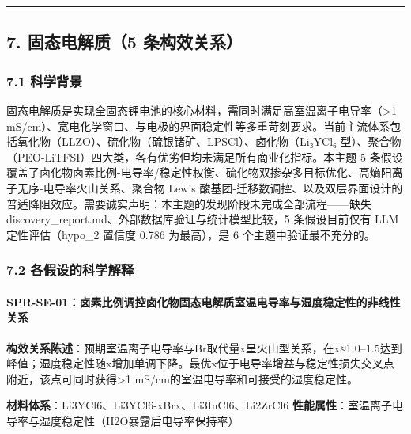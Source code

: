 \documentclass[12pt,a4paper]{ctexart}
\begin{document}
\begin{center}\rule{0.5\linewidth}{0.5pt}\end{center}

\subsection{7. 固态电解质（5 条构效关系）}\label{ux56faux6001ux7535ux89e3ux8d285-ux6761ux6784ux6548ux5173ux7cfb}

\subsubsection{7.1 科学背景}\label{ux79d1ux5b66ux80ccux666f-5}

固态电解质是实现全固态锂电池的核心材料，需同时满足高室温离子电导率（\textgreater1 mS/cm）、宽电化学窗口、与电极的界面稳定性等多重苛刻要求。当前主流体系包括氧化物（LLZO）、硫化物（硫银锗矿、LPSCl）、卤化物（Li₃YCl₆ 型）、聚合物（PEO-LiTFSI）四大类，各有优劣但均未满足所有商业化指标。本主题 5 条假设覆盖了卤化物卤素比例-电导率/稳定性权衡、硫化物双掺杂多目标优化、高熵阳离子无序-电导率火山关系、聚合物 Lewis 酸基团-迁移数调控、以及双层界面设计的普适降阻效应。需要诚实声明：本主题的发现阶段未完成全部流程------缺失 discovery\_report.md、外部数据库验证与统计模型比较，5 条假设目前仅有 LLM 定性评估（hypo\_2 置信度 0.786 为最高），是 6 个主题中验证最不充分的。

\subsubsection{7.2 各假设的科学解释}\label{ux5404ux5047ux8bbeux7684ux79d1ux5b66ux89e3ux91ca-5}

\paragraph{SPR-SE-01：卤素比例调控卤化物固态电解质室温电导率与湿度稳定性的非线性关系}\label{spr-se-01ux5364ux7d20ux6bd4ux4f8bux8c03ux63a7ux5364ux5316ux7269ux56faux6001ux7535ux89e3ux8d28ux5ba4ux6e29ux7535ux5bfcux7387ux4e0eux6e7fux5ea6ux7a33ux5b9aux6027ux7684ux975eux7ebfux6027ux5173ux7cfb}

\textbf{构效关系陈述}：预期室温离子电导率与Br取代量x呈火山型关系，在x≈1.0--1.5达到峰值；湿度稳定性随x增加单调下降。最优x位于电导率增益与稳定性损失交叉点附近，该点可同时获得\textgreater1 mS/cm的室温电导率和可接受的湿度稳定性。

\textbf{材料体系}：Li3YCl6、Li3YCl6-xBrx、Li3InCl6、Li2ZrCl6 \textbar{} \textbf{性能属性}：室温离子电导率与湿度稳定性（H2O暴露后电导率保持率）
\end{document}
